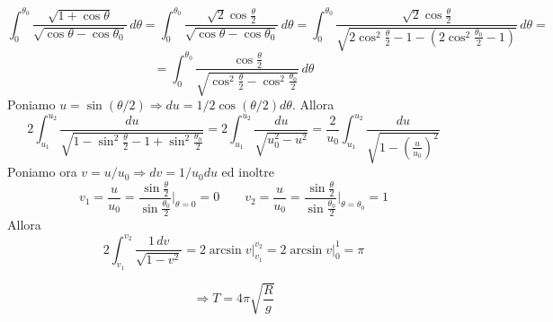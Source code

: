 \[
\int_0^{\theta_0}
\frac{\sqrt{1+\cos\theta}}{\sqrt{\cos\theta-\cos\theta_0}}\,d\theta
=
\int_0^{\theta_0}
\frac{\sqrt{2}\cos\frac{\theta}{2}}{\sqrt{\cos\theta-\cos\theta_0}}\,d\theta
=
\int_0^{\theta_0}
\frac{\sqrt{2}\cos\frac{\theta}{2}}{\sqrt{2\cos^2\frac{\theta}{2}-1-\left(2\cos^2\frac{\theta_0}{2}-1\right)}}\,d\theta
=
\]
\[
=
\int_0^{\theta_0}
\frac{\cos\frac{\theta}{2}}{\sqrt{\cos^2\frac{\theta}{2}-\cos^2\frac{\theta_0}{2}}}\,d\theta
\]
Poniamo $u = \sin(\theta / 2) \Rightarrow du = 1/2 \cos(\theta / 2) d \theta$. Allora
\[
2\int_{u_1}^{u_2}
\frac{du}{\sqrt{1-\sin^2\frac{\theta}{2}-1+\sin^2\frac{\theta_0}{2}}}
=
2\int_{u_1}^{u_2}
\frac{du}{\sqrt{u_0^2-u^2}}
=
\frac{2}{u_0}
\int_{u_1}^{u_2}
\frac{du}{\sqrt{1-\left(\frac{u}{u_0}\right)^2}}
\]
Poniamo ora $v = u / u_0 \Rightarrow dv = 1/u_0 du$ ed inoltre
\[
v_1
=
\frac{u}{u_0}
=
\frac{\sin\frac{\theta}{2}}{\sin\frac{\theta_0}{2}}
\Big|_{\theta=0}
=
0
\qquad
v_2
=
\frac{u}{u_0}
=
\frac{\sin\frac{\theta}{2}}{\sin\frac{\theta_0}{2}}
\Big|_{\theta=\theta_0}
=
1
\]
Allora
\[
2
\int_{v_1}^{v_2}
\frac{1\,dv}{\sqrt{1-v^2}}
=
2\arcsin v\Big|_{v_1}^{v_2}
=
2\arcsin v\Big|_0^1
=
\pi
\]

\[
\Rightarrow
T=
4\pi\sqrt{\frac{R}{g}}
\]
